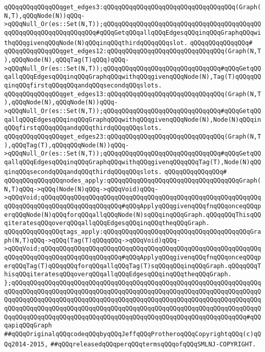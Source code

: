 \verb|qQQqqQQqqQQqqQQqget_edges3:qQQqqQQqqQQqqQQqqQQqqQQqqQQqqQQqqQQq(Graph(N,T),qQQqNode(N))qQQq->qQQqNull_Or(es::Set(N,T));qQQqqQQqqQQqqQQqqQQqqQQqqQQqqQQqqQQqqQQqqQQqqQQqqQQqqQQqqQQqqQQqqQQq#qQQqGetqQQqallqQQqEdgesqQQqinqQQqGraphqQQqwithqQQqgivenqQQqNode(N)qQQqinqQQqthirdqQQqqQQqslot.|\newline
\verb|qQQqqQQqqQQqqQQq#|\newline
\verb|qQQqqQQqqQQqqQQqget_edges12:qQQqqQQqqQQqqQQqqQQqqQQqqQQqqQQq(Graph(N,T),qQQqNode(N),qQQqTag(T)qQQq)qQQq->qQQqNull_Or(es::Set(N,T));qQQqqQQqqQQqqQQqqQQqqQQqqQQqqQQq#qQQqGetqQQqallqQQqEdgesqQQqinqQQqGraphqQQqwithqQQqgivenqQQqNode(N),Tag(T)qQQqqQQqinqQQqfirstqQQqqQQqandqQQqsecondqQQqslots.|\newline
\verb|qQQqqQQqqQQqqQQqget_edges13:qQQqqQQqqQQqqQQqqQQqqQQqqQQqqQQq(Graph(N,T),qQQqNode(N),qQQqNode(N))qQQq->qQQqNull_Or(es::Set(N,T));qQQqqQQqqQQqqQQqqQQqqQQqqQQqqQQq#qQQqGetqQQqallqQQqEdgesqQQqinqQQqGraphqQQqwithqQQqgivenqQQqNode(N),Node(N)qQQqinqQQqfirstqQQqqQQqandqQQqthirdqQQqqQQqslots.|\newline
\verb|qQQqqQQqqQQqqQQqget_edges23:qQQqqQQqqQQqqQQqqQQqqQQqqQQqqQQq(Graph(N,T),qQQqTag(T),qQQqqQQqNode(N))qQQq->qQQqNull_Or(es::Set(N,T));qQQqqQQqqQQqqQQqqQQqqQQqqQQqqQQq#qQQqGetqQQqallqQQqEdgesqQQqinqQQqGraphqQQqwithqQQqgivenqQQqqQQqTag(T),Node(N)qQQqinqQQqsecondqQQqandqQQqthirdqQQqqQQqslots.|\newline
\verb|qQQqqQQqqQQqqQQq#|\newline
\newline
\verb|qQQqqQQqqQQqqQQqnodes_apply:qQQqqQQqqQQqqQQqqQQqqQQqqQQqqQQqqQQqGraph(N,T)qQQq->qQQq(Node(N)qQQq->qQQqVoid)qQQq->qQQqVoid;qQQqqQQqqQQqqQQqqQQqqQQqqQQqqQQqqQQqqQQqqQQqqQQqqQQqqQQqqQQqqQQqqQQqqQQqqQQqqQQqqQQqqQQqqQQq#qQQqApplyqQQqgivenqQQqfnqQQqonceqQQqperqQQqNode(N)qQQqforqQQqallqQQqNode(N)sqQQqinqQQqGraph.qQQqqQQqThisqQQqiteratesqQQqoverqQQqallqQQqEdgesqQQqinqQQqtheqQQqGraph.|\newline
\verb|qQQqqQQqqQQqqQQqtags_apply:qQQqqQQqqQQqqQQqqQQqqQQqqQQqqQQqqQQqqQQqGraph(N,T)qQQq->qQQq(Tag(T)qQQqqQQq->qQQqVoid)qQQq->qQQqVoid;qQQqqQQqqQQqqQQqqQQqqQQqqQQqqQQqqQQqqQQqqQQqqQQqqQQqqQQqqQQqqQQqqQQqqQQqqQQqqQQqqQQqqQQqqQQq#qQQqApplyqQQqgivenqQQqfnqQQqonceqQQqperqQQqTag(T)qQQqqQQqforqQQqallqQQqTag(T)sqQQqqQQqinqQQqGraph.qQQqqQQqThisqQQqiteratesqQQqoverqQQqallqQQqEdgesqQQqinqQQqtheqQQqGraph.|\newline
\newline
\verb|};qQQqqQQqqQQqqQQqqQQqqQQqqQQqqQQqqQQqqQQqqQQqqQQqqQQqqQQqqQQqqQQqqQQqqQQqqQQqqQQqqQQqqQQqqQQqqQQqqQQqqQQqqQQqqQQqqQQqqQQqqQQqqQQqqQQqqQQqqQQqqQQqqQQqqQQqqQQqqQQqqQQqqQQqqQQqqQQqqQQqqQQqqQQqqQQqqQQqqQQqqQQqqQQqqQQqqQQqqQQqqQQqqQQqqQQqqQQqqQQqqQQqqQQqqQQqqQQqqQQqqQQqqQQqqQQqqQQqqQQqqQQqqQQqqQQqqQQqqQQqqQQqqQQqqQQqqQQqqQQqqQQqqQQqqQQqqQQqqQQqqQQq#qQQqapiqQQqGraph|\newline
\newline
\newline
\verb|##qQQqOriginalqQQqcodeqQQqbyqQQqJeffqQQqProtheroqQQqCopyrightqQQq(c)qQQq2014-2015,|\newline
\verb|##qQQqreleasedqQQqperqQQqtermsqQQqofqQQqSMLNJ-COPYRIGHT.|\newline


